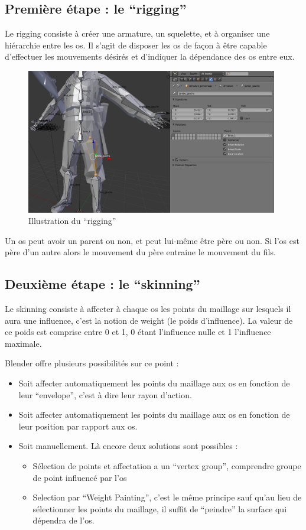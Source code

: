 \documentclass[11pt]{report}
\begin{document}
\subsection{Première étape : le ``rigging''}

Le rigging consiste à créer une armature, un squelette, et à organiser une hiérarchie entre les os.
Il s’agit de disposer les os de façon à être capable d’effectuer les mouvements désirés et d’indiquer la dépendance des os entre eux.

\begin{figure}[htbp]
\centering
\includegraphics[width=11cm]{rigging.png}
\caption{Illustration du ``rigging''}
\end{figure}

Un os peut avoir un parent ou non, et peut lui-même être père ou non. Si l’os est père d’un autre alors le mouvement du père entraine le mouvement du fils.

\subsection{Deuxième étape : le ``skinning''}

Le skinning consiste à affecter à chaque os les points du maillage sur lesquels il aura une influence, c’est la notion de weight (le poids d’influence). La valeur de ce poids est comprise entre 0 et 1, 0 étant l’influence nulle et 1 l’influence maximale.

Blender offre plusieurs possibilités sur ce point :

\begin{itemize}
\item Soit affecter automatiquement les points du maillage aux os en  fonction de leur ``envelope'', c’est à dire leur rayon d’action.
\item Soit affecter automatiquement les points du maillage aux os en  fonction de leur position par rapport aux os.
\item Soit manuellement. Là encore deux solutions sont possibles :
\begin{itemize}
	\item Sélection de points et affectation a un ``vertex group'', comprendre groupe de point influencé par l’os
	\item Selection par ``Weight Painting'', c’est le même principe sauf qu’au lieu de sélectionner les points du maillage, il suffit de ``peindre'' la surface qui dépendra de l’os.
\end{itemize}
\end{itemize}
\end{document}
